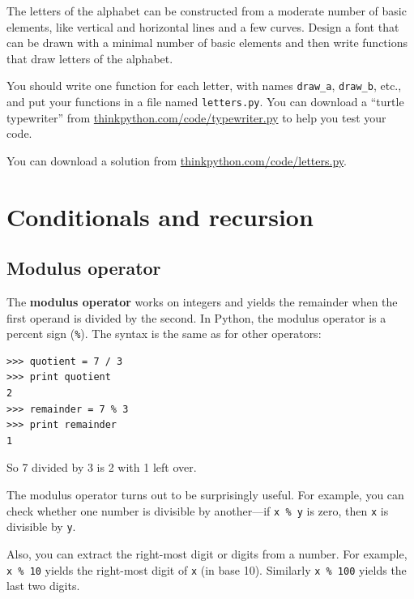 \documentclass[10pt]{book}
\begin{document}
\begin{ex}

The letters of the alphabet can be constructed from a moderate
number of basic elements, like vertical and horizontal lines
and a few curves.  Design a font that can be drawn with a
minimal number of basic elements and then write functions
that draw letters of the alphabet.

You should write one function for each letter, with names
\verb"draw_a", \verb"draw_b", etc., and put your functions
in a file named {\tt letters.py}.  You can download a
``turtle typewriter'' from \url{thinkpython.com/code/typewriter.py}
to help you test your code.

You can download a solution from \url{thinkpython.com/code/letters.py}.

\end{ex}



\chapter{Conditionals and recursion}

\section{Modulus operator}


The {\bf modulus operator} works on integers and yields the remainder
when the first operand is divided by the second.  In Python, the
modulus operator is a percent sign (\verb"%").  The syntax is the same
as for other operators:

\beforeverb
\begin{verbatim}
>>> quotient = 7 / 3
>>> print quotient
2
>>> remainder = 7 % 3
>>> print remainder
1
\end{verbatim}
\afterverb
%
So 7 divided by 3 is 2 with 1 left over.

The modulus operator turns out to be surprisingly useful.  For
example, you can check whether one number is divisible by another---if
{\tt x \% y} is zero, then {\tt x} is divisible by {\tt y}.


Also, you can extract the right-most digit
or digits from a number.  For example, {\tt x \% 10} yields the
right-most digit of {\tt x} (in base 10).  Similarly {\tt x \% 100}
yields the last two digits.
\end{document}
